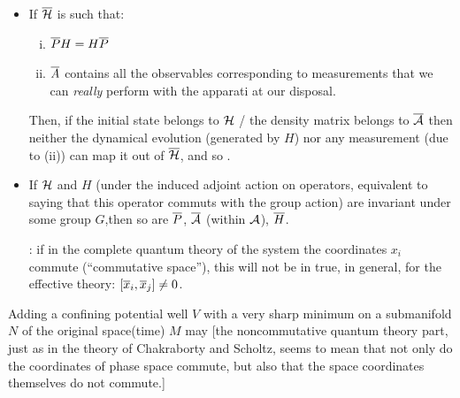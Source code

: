{\begin{itemize}
        \item If $\overline{\mathcal H}$ is such that:
        
            \begin{enumerate}[(i)]
            
            \item $\overline{P} H = H \overline{P}$
            
            \item $\overline{A}$  contains all the observables corresponding to measurements that we can \textit{really} perform with the apparati at our disposal.
                
            \end{enumerate}
            
        Then, if the initial state belongs to $\mathcal H$ / the density matrix belongs to $\overline{\mathcal A}$ then neither the dynamical evolution (generated by $H$) nor any measurement (due to (ii)) can map it out of $\overline{\mathcal H}$, and so .
        
        \item If $\mathcal H$ and $H$ (under the induced adjoint action on operators, equivalent to saying that this operator commuts with the group action) are invariant under some group $G$,then so are $\overline{P}$, $\overline{\mathcal A}$ (within $\mathcal A$), $\overline{H}$.
        
        : if in the complete quantum theory of the system the coordinates $x_i$ commute (``commutative space''), this will not be in true, in general, for the effective theory: $[\overline{x}_i, \overline{x}_j] \neq 0$.
        
        \end{itemize}
        
        
        
    \cite{FioreTheCase2020} Adding a confining potential well $V$ with a very sharp minimum on a submanifold $N$ of the original space(time) $M$ may  [the noncommutative quantum theory part, just as in the theory of Chakraborty and Scholtz, seems to mean that not only do the coordinates of phase space commute, but also that the space coordinates themselves do not commute.]
    
}
